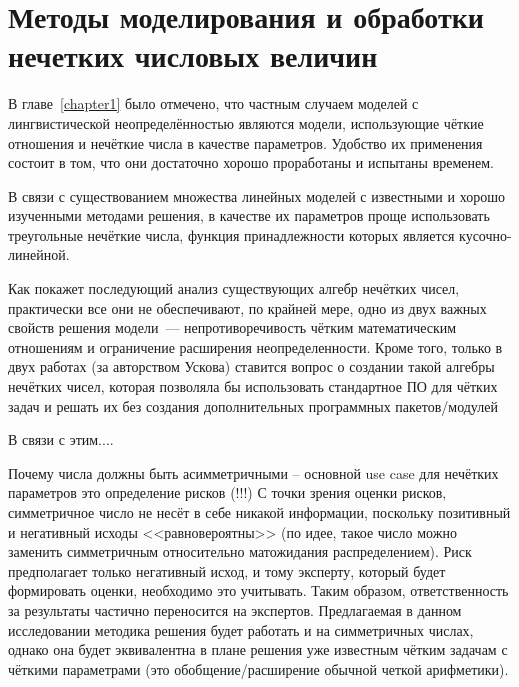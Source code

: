 \chapter{Методы моделирования и обработки нечетких числовых величин}
\label{chapter2}

В главе~\ref{chapter1} было отмечено, что частным случаем моделей с лингвистической неопределённостью являются модели, использующие чёткие отношения и нечёткие числа в качестве параметров. Удобство их применения состоит в том, что они достаточно хорошо проработаны и испытаны временем.

В связи с существованием множества линейных моделей с известными и хорошо изученными методами решения, в качестве их параметров проще использовать треугольные нечёткие числа, функция принадлежности которых является кусочно-линейной.


Как покажет последующий анализ существующих алгебр нечётких чисел, практически все они не обеспечивают, по крайней мере, одно из двух важных свойств решения модели~--- непротиворечивость чётким математическим отношениям и ограничение расширения неопределенности. Кроме того, только в двух работах (за авторством Ускова) ставится вопрос о создании такой алгебры нечётких чисел, которая позволяла бы использовать стандартное ПО для чётких задач и решать их без создания дополнительных программных пакетов/модулей

В связи с этим.... 

Почему числа должны быть асимметричными – основной use case для нечётких параметров это определение рисков (!!!) С точки зрения оценки рисков, симметричное число не несёт в себе никакой информации, поскольку позитивный и негативный исходы <<равновероятны>> (по идее, такое число можно заменить симметричным относительно матожидания распределением). Риск предполагает только негативный исход, и тому эксперту, который будет формировать оценки, необходимо это учитывать. Таким образом, ответственность за результаты частично переносится на экспертов. Предлагаемая в данном исследовании методика решения будет работать и на симметричных числах, однако она будет эквивалентна в плане решения уже известным чётким задачам с чёткими параметрами (это обобщение/расширение обычной четкой арифметики).

